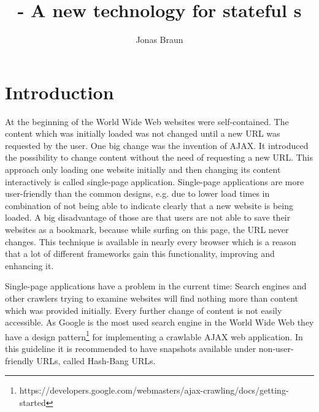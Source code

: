\documentclass[f,bachelor,binding,twoside,palatino]{WeSTthesis}
\author{Jonas Braun}
\title{\pjaxr{} - A new technology for stateful \singlePageApplication{}s}
\def \ajax {AJAX}
\def \singlePageApplication {single-page application}
\def \SinglePageApplication {Single-page application}
\begin{document}

\maketitle %

\tableofcontents

\varclearpage



\newcommand\todo[1]{\textcolor{red}{#1}}

\section{Introduction}
  At the beginning of the World Wide Web websites were self-contained. The content which was initially loaded was not changed until a new URL was requested by the user.
  One big change was the invention of \ajax{}. It introduced the possibility to change content without the need of requesting a new URL.
  This approach only loading one website initially and then changing its content interactively is called \singlePageApplication{}.
  \SinglePageApplication{}s are more user-friendly than the common designs, e.g. due to lower load times in combination of not being able to indicate clearly that a new website is being loaded.
  A big disadvantage of those are that users are not able to save their websites as a bookmark, because while surfing on this page, the URL never changes.
  This technique is available in nearly every browser which is a reason that a lot of different frameworks gain this functionality, improving and enhancing it.

  \SinglePageApplication{}s have a problem in the current time: Search engines and other crawlers trying to examine websites will find nothing more than content which was provided initially. Every further change of content is not easily accessible.
  As Google is the most used search engine in the World Wide Web they have a design pattern\footnote{https://developers.google.com/webmasters/ajax-crawling/docs/getting-started} for implementing a crawlable \ajax{} web application. 
  In this guideline it is recommended to have snapshots available under non-user-friendly URLs, called Hash-Bang URLs.
\end{document}
